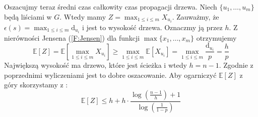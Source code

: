 Oszacujmy teraz średni czas całkowity czas propagacji drzewa.
Niech $\{u_1,\dots, u_m\}$ będą liściami w $G$. Wtedy mamy $Z = \max_{1\le i \le m} X_{u _i}$.
Zauważmy, że $\epsilon(s) = \max_{1\le i \le m} \mathrm{d}_{u_i}$ i jest to wysokość drzewa. Oznaczmy ją przez $h$. Z nierówności Jensena (\cref{F:Jensen}) dla funkcji $\max\{x_1,\dots,x_m\}$ otrzymujemy
\[
    \mathbb{E}[Z]=\mathbb{E}[\max_{1\le i \le m} X_{u _i}] \ge \max_{1\le i \le m} \mathbb{E}[X_{u _i}] = \max_{1\le i \le m} \frac{\mathrm{d}_{u_i}}{p} = \frac{h}{p}
\]
Największą wysokość ma drzewo, które jest ścieżka i wtedy $h=n-1$. Zgodnie z poprzednimi wyliczeniami jest to dobre oszacowanie. Aby ogarniczyć $\mathbb{E}[Z]$ z góry skorzystamy z :
\[
    \mathbb{E}[Z] \le h  + h \cdot \frac{\log(\frac{n-1}{h}) + 1}{\log(\frac{1}{1-p})}
\]
